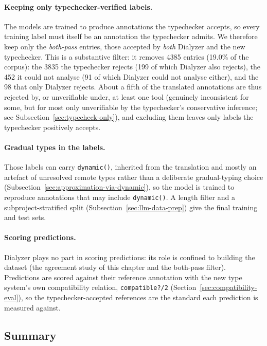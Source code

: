 \paragraph{Keeping only typechecker-verified labels.}
The models are trained to produce annotations the typechecker accepts, so every training label must itself be an annotation the typechecker admits.
We therefore keep only the \emph{both-pass} entries, those accepted by \emph{both} Dialyzer and the new typechecker.
This is a substantive filter: it removes \num{4385} entries (19.0\% of the corpus): the \num{3835} the typechecker rejects (199 of which Dialyzer also rejects), the 452 it could not analyse (91 of which Dialyzer could not analyse either), and the 98 that only Dialyzer rejects.
About a fifth of the translated annotations are thus rejected by, or unverifiable under, at least one tool (genuinely inconsistent for some, but for most only unverifiable by the typechecker's conservative inference; see Subsection~\ref{sec:typecheck-only}), and excluding them leaves only labels the typechecker positively accepts.

\paragraph{Gradual types in the labels.}
Those labels can carry \texttt{dynamic()}, inherited from the translation and mostly an artefact of unresolved remote types rather than a deliberate gradual-typing choice (Subsection~\ref{sec:approximation-via-dynamic}), so the model is trained to reproduce annotations that may include \texttt{dynamic()}.
A length filter and a subproject-stratified split (Subsection~\ref{sec:llm-data-prep}) give the final training and test sets.

\paragraph{Scoring predictions.}
Dialyzer plays no part in scoring predictions: its role is confined to building the dataset (the agreement study of this chapter and the both-pass filter).
Predictions are scored against their reference annotation with the new type system's own compatibility relation, \texttt{compatible?/2} (Section~\ref{sec:compatibility-eval}), so the typechecker-accepted references are the standard each prediction is measured against.

\subsection{Summary}

